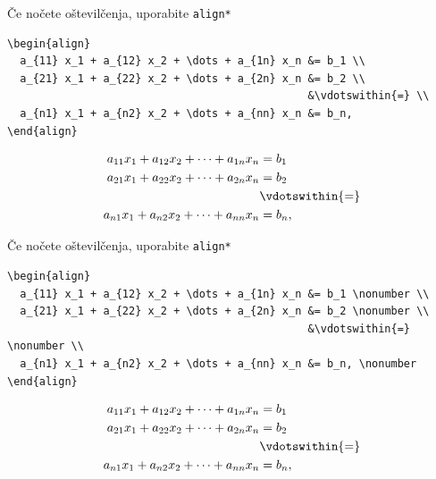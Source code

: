 \documentclass[aspectratio=169]{beamer}
\begin{document}
\begin{frame}[fragile]{Če nočete oštevilčenja, uporabite \texttt{align*}}
  \begin{slaboenv}
    \begin{verbatim}
\begin{align}
  a_{11} x_1 + a_{12} x_2 + \dots + a_{1n} x_n &= b_1 \\
  a_{21} x_1 + a_{22} x_2 + \dots + a_{2n} x_n &= b_2 \\
                                               &\vdotswithin{=} \\
  a_{n1} x_1 + a_{n2} x_2 + \dots + a_{nn} x_n &= b_n,
\end{align}
    \end{verbatim}
    \small
    \begin{align}
      a_{11} x_1 + a_{12} x_2 + \dots + a_{1n} x_n &= b_1 \\
      a_{21} x_1 + a_{22} x_2 + \dots + a_{2n} x_n &= b_2 \\
      &\vdotswithin{=} \\
      a_{n1} x_1 + a_{n2} x_2 + \dots + a_{nn} x_n &= b_n,
    \end{align}
  \end{slaboenv}
\end{frame}

\begin{frame}[fragile]{Če nočete oštevilčenja, uporabite \texttt{align*}}
  \begin{slaboenv}
    \begin{verbatim}
\begin{align}
  a_{11} x_1 + a_{12} x_2 + \dots + a_{1n} x_n &= b_1 \nonumber \\
  a_{21} x_1 + a_{22} x_2 + \dots + a_{2n} x_n &= b_2 \nonumber \\
                                               &\vdotswithin{=} \nonumber \\
  a_{n1} x_1 + a_{n2} x_2 + \dots + a_{nn} x_n &= b_n, \nonumber
\end{align}
    \end{verbatim}
    \small
    \begin{align}
      a_{11} x_1 + a_{12} x_2 + \dots + a_{1n} x_n &= b_1 \nonumber \\
      a_{21} x_1 + a_{22} x_2 + \dots + a_{2n} x_n &= b_2 \nonumber \\
      &\vdotswithin{=} \nonumber \\
      a_{n1} x_1 + a_{n2} x_2 + \dots + a_{nn} x_n &= b_n, \nonumber
    \end{align}
  \end{slaboenv}
\end{frame}
\end{document}
